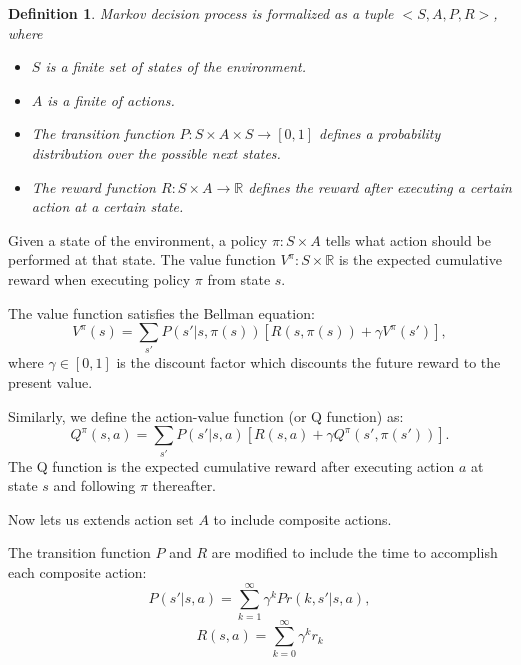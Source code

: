 \documentclass{article} %
\newtheorem{definition}{Definition}
\begin{document}
\begin{definition} Markov decision process is formalized as a tuple $<S, A, P, R>$, where
\begin{itemize}{}
\item $S$ is a finite set of states of the environment.
\item $A$ is a finite of actions.
\item The transition function $P:S \times A \times S \rightarrow [0, 1]$ defines a probability distribution over the possible next states. 
\item The reward function $R:S \times A \rightarrow \mathbb{R}$ defines the reward after executing a certain action at a certain state.
\end{itemize}
\end{definition}

Given a state of the environment, a policy $\pi: S \times A$ tells what action should be performed at that state. 
The value function $V^{\pi}: S \times \mathbb{R}$ is the expected cumulative reward when executing
policy $\pi$ from state $s$.

The value function satisfies the Bellman equation:
\begin{equation}
    V^{\pi}(s) = \sum_{s'}P(s'|s, \pi(s))[R(s, \pi(s)) + \gamma V^{\pi}(s')],
    \label{eq:V}
\end{equation}
where $\gamma \in [0, 1]$ is the discount factor which discounts the future reward to the present value.

Similarly, we define the action-value function (or Q function) as:
\begin{equation}
    Q^{\pi}(s, a) = \sum_{s'}P(s'|s, a)[R(s, a) + \gamma Q^{\pi}(s', \pi(s'))].
    \label{eq:Q}
\end{equation}
The Q function is the expected cumulative reward after executing action $a$ at state $s$ and following
$\pi$ thereafter.

Now lets us extends action set $A$ to include composite actions.

The transition function $P$ and $R$ are modified to include the time to accomplish each composite action:
\begin{equation}
    P(s'|s, a) = \sum^{\infty}_{k=1} \gamma^k Pr(k, s'|s, a),
    \label{eq:multiProb}
\end{equation}
\begin{equation}
    R(s, a) = \sum^{\infty}_{k=0} \gamma^k r_k
\end{equation}
\end{document}
